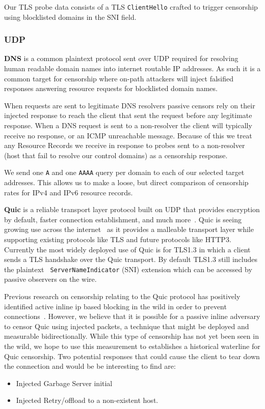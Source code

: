 Our TLS probe data consists of a TLS \texttt{ClientHello} crafted to
trigger censorship using blocklisted domains in the SNI field.

\subsubsection{UDP}

\textbf{DNS} is a common plaintext protocol sent over UDP required for resolving
human readable domain names into internet routable IP addresses. As such it is a
common target for censorship where on-path attackers will inject falsified
responses answering resource requests for blocklisted domain names.

When requests are sent to legitimate DNS resolvers passive censors rely on their
injected response to reach the client that sent the request before any
legitimate response. When a DNS request is sent to a non-resolver the
client will typically receive no response, or an ICMP unreachable message.
Because of this we treat any Resource Records we receive in response to probes
sent to a non-resolver (host that fail to resolve our control domains) as a
censorship response.

We send one {\tt A} and one {\tt AAAA} query per domain to each of our selected
target addresses. This allows us to make a loose, but direct comparison of
censorship rates for IPv4 and IPv6 resource records.

\textbf{Quic} is a reliable transport layer protocol built on UDP that provides
encryption by default, faster connection establishment, and much
more~\cite{RFC9000}. Quic is seeing growing use across the internet~\cite{} as
it provides a malleable transport layer while supporting existing protocols like
TLS and future protocols like HTTP3. Currently the most widely deployed use of
Quic is for TLS1.3 in which a client sends a TLS handshake over the Quic
transport. By default TLS1.3 still includes the plaintext {\tt
ServerNameIndicator} (SNI) extension which can be accessed by passive observers
on the wire.

Previous research on censorship relating to the Quic protocol has positively
identified active inline ip based blocking in the wild in order to prevent
connections~\cite{}. However, we believe that it is possible for a passive
inline adversary to censor Quic using injected packets, a technique that might be
deployed and measurable bidirectionally. While this type of censorship has not
yet been seen in the wild, we hope to use this measurement to establishes a
historical waterline for Quic censorship. Two potential responses that could
cause the client to tear down the connection and would be be interesting to find
are:
\begin{itemize}
	\item Injected Garbage Server initial
	\item Injected Retry/offload to a non-existent host.
\end{itemize}



